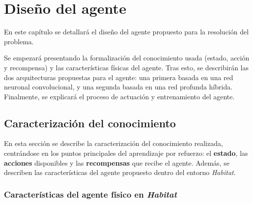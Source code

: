 \chapter{Diseño del agente}

En este capítulo se detallará el diseño del agente propuesto para la resolución del problema. 

Se empezará presentando la formalización del conocimiento usada (estado, acción y recompensa) y las características físicas del agente. Tras esto, se describirán las dos arquitecturas propuestas para el agente: una primera basada en una red neuronal convolucional, y una segunda basada en una red profunda híbrida. Finalmente, se explicará el proceso de actuación y entrenamiento del agente.

\section{Caracterización del conocimiento}

En esta sección se describe la caracterización del conocimiento realizada, centrándose en los puntos principales del aprendizaje por refuerzo: el \textbf{estado}, las \textbf{acciones} disponibles y las \textbf{recompensas} que recibe el agente. Además, se describen las características del agente propuesto dentro del entorno \textit{Habitat}.

\subsection{Características del agente físico en \textit{Habitat}}

